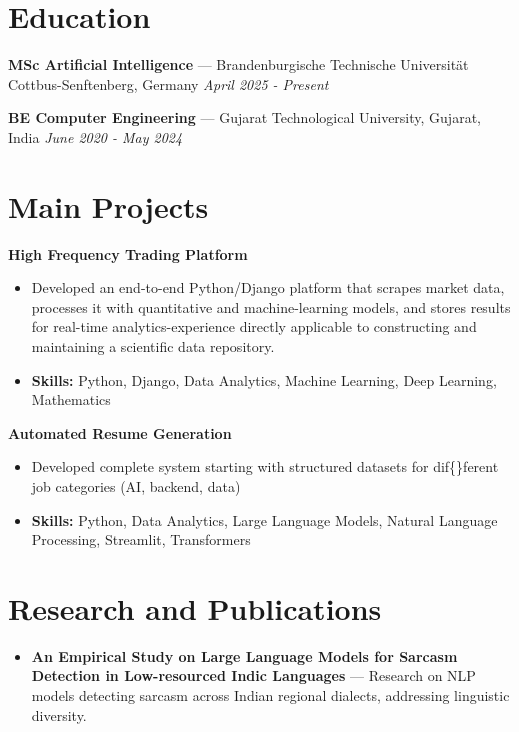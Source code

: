 \documentclass[a4paper,10pt]{article}
\begin{document}
\section*{Education}
\textbf{MSc Artificial Intelligence} — Brandenburgische Technische Universität Cottbus-Senftenberg, Germany \hfill \textit{April 2025 - Present}\par
\vspace{1.5pt}
\textbf{BE Computer Engineering} — Gujarat Technological University, Gujarat, India \hfill \textit{June 2020 - May 2024}\par

\section*{Main Projects}
\textbf{High Frequency Trading Platform}\par
\vspace{1pt}
\begin{itemize}
  \item Developed an end-to-end Python/Django platform that scrapes market data, processes it with quantitative and machine-learning models, and stores results for real-time analytics-experience directly applicable to constructing and maintaining a scientific data repository.
  \item \textbf{Skills:} Python, Django, Data Analytics, Machine Learning, Deep Learning, Mathematics
\end{itemize}
\vspace{3pt}
\textbf{Automated Resume Generation}\par
\vspace{1pt}
\begin{itemize}
  \item Developed complete system starting with structured datasets for dif\{\}ferent job categories (AI, backend, data)
  \item \textbf{Skills:} Python, Data Analytics, Large Language Models, Natural Language Processing, Streamlit, Transformers
\end{itemize}

\section*{Research and Publications}
\begin{itemize}
\item \textbf{An Empirical Study on Large Language Models for Sarcasm Detection in Low-resourced Indic Languages} — Research on NLP models detecting sarcasm across Indian regional dialects, addressing linguistic diversity.
\end{itemize}
\end{document}
